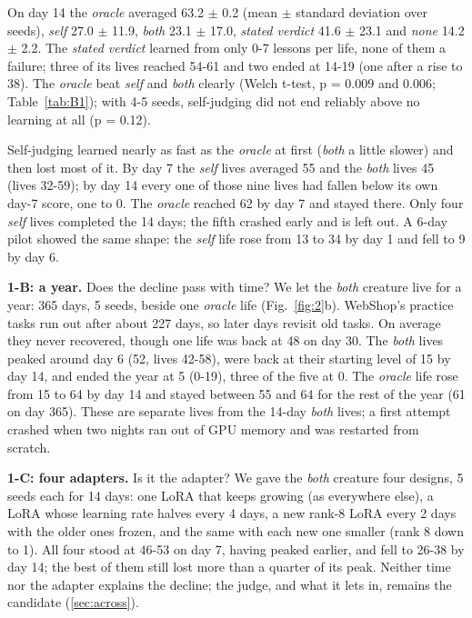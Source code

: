 On day 14 the \emph{oracle} averaged 63.2 $\pm$ 0.2 (mean $\pm$ standard deviation over seeds), \emph{self} 27.0 $\pm$ 11.9, \emph{both} 23.1 $\pm$ 17.0, \emph{stated verdict} 41.6 $\pm$ 23.1 and \emph{none} 14.2 $\pm$ 2.2. The \emph{stated verdict} learned from only 0-7 lessons per life, none of them a failure; three of its lives reached 54-61 and two ended at 14-19 (one after a rise to 38). The \emph{oracle} beat \emph{self} and \emph{both} clearly (Welch t-test, p = 0.009 and 0.006; Table~\ref{tab:B1}); with 4-5 seeds, self-judging did not end reliably above no learning at all (p = 0.12).

Self-judging learned nearly as fast as the \emph{oracle} at first (\emph{both} a little slower) and then lost most of it. By day 7 the \emph{self} lives averaged 55 and the \emph{both} lives 45 (lives 32-59); by day 14 every one of those nine lives had fallen below its own day-7 score, one to 0. The \emph{oracle} reached 62 by day 7 and stayed there. Only four \emph{self} lives completed the 14 days; the fifth crashed early and is left out. A 6-day pilot showed the same shape: the \emph{self} life rose from 13 to 34 by day 1 and fell to 9 by day 6.

\textbf{1-B: a year.} Does the decline pass with time? We let the \emph{both} creature live for a year: 365 days, 5 seeds, beside one \emph{oracle} life (Fig.~\ref{fig:2}b). WebShop's practice tasks run out after about 227 days, so later days revisit old tasks. On average they never recovered, though one life was back at 48 on day 30. The \emph{both} lives peaked around day 6 (52, lives 42-58), were back at their starting level of 15 by day 14, and ended the year at 5 (0-19), three of the five at 0. The \emph{oracle} life rose from 15 to 64 by day 14 and stayed between 55 and 64 for the rest of the year (61 on day 365). These are separate lives from the 14-day \emph{both} lives; a first attempt crashed when two nights ran out of GPU memory and was restarted from scratch.

\textbf{1-C: four adapters.} Is it the adapter? We gave the \emph{both} creature four designs, 5 seeds each for 14 days: one LoRA that keeps growing (as everywhere else), a LoRA whose learning rate halves every 4 days, a new rank-8 LoRA every 2 days with the older ones frozen, and the same with each new one smaller (rank 8 down to 1). All four stood at 46-53 on day 7, having peaked earlier, and fell to 26-38 by day 14; the best of them still lost more than a quarter of its peak. Neither time nor the adapter explains the decline; the judge, and what it lets in, remains the candidate (\ref{sec:across}).

